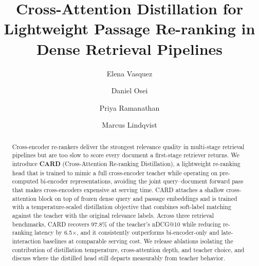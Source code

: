 \documentclass[sigconf,anonymous,review]{acmart}
\begin{document}
\title{Cross-Attention Distillation for Lightweight Passage Re-ranking in Dense Retrieval
Pipelines}

\author{Elena Vasquez}

\author{Daniel Osei}

\author{Priya Ramanathan}

\author{Marcus Lindqvist}

\renewcommand{\shortauthors}{Vasquez et al.}

\begin{abstract}
Cross-encoder re-rankers deliver the strongest relevance quality in multi-stage retrieval
pipelines but are too slow to score every document a first-stage retriever returns. We
introduce \textbf{CARD} (Cross-Attention Re-ranking Distillation), a lightweight re-ranking
head that is trained to mimic a full cross-encoder teacher while operating on pre-computed
bi-encoder representations, avoiding the joint query--document forward pass that makes
cross-encoders expensive at serving time. CARD attaches a shallow cross-attention block on
top of frozen dense query and passage embeddings and is trained with a temperature-scaled
distillation objective that combines soft-label matching against the teacher with the
original relevance labels. Across three retrieval benchmarks, CARD recovers 97.8\% of the
teacher's nDCG@10 while reducing re-ranking latency by 6.5$\times$, and it consistently
outperforms bi-encoder-only and late-interaction baselines at comparable serving cost. We
release ablations isolating the contribution of distillation temperature, cross-attention
depth, and teacher choice, and discuss where the distilled head still departs measurably
from teacher behavior.
\end{abstract}

\end{document}
